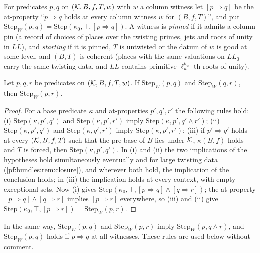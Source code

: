 For predicates $p,q$ on $(\mathcal K,B,f,T,w)$ with $w$ a column witness let $[p\Rightarrow q]$ be the at-property ``$p\Rightarrow q$
holds at every column witness $w$ for $(B,f,T)$'', and put $\mathrm{Step}_W(p,q)=\mathrm{Step}(\kappa_0,\top,[p\Rightarrow q])$. A
witness is \emph{pinned} if it admits a column pin (a record of
choices of places over the twisting primes, jets and roots of unity in $\mathit{LL}$), and \emph{starting} if it is pinned,
$T$ is untwisted or the datum of $w$ is good at some level, and $(B,T)$ is coherent (places with the same valuations on
$\mathit{LL}_0$ carry the same twisting data, and $\mathit{LL}$ contains primitive $\ell_w^{k_w}$-th roots of unity).

\begin{lemma}\label{pf:bundles:lem:stepw}
Let $p,q,r$ be predicates on $(\mathcal K,B,f,T,w)$. If $\mathrm{Step}_W(p,q)$ and $\mathrm{Step}_W(q,r)$, then $\mathrm{Step}_W(p,r)$.
\end{lemma}

\begin{proof}
For a base predicate $\kappa$ and at-properties $p',q',r'$ the following rules hold: (i) $\mathrm{Step}(\kappa,p',q')$ and
$\mathrm{Step}(\kappa,p',r')$ imply $\mathrm{Step}(\kappa,p',q'\wedge r')$; (ii) $\mathrm{Step}(\kappa,p',q')$ and
$\mathrm{Step}(\kappa,q',r')$ imply $\mathrm{Step}(\kappa,p',r')$; (iii) if $p'\Rightarrow q'$ holds at every $(\mathcal K,B,f,T)$ such that the
pre-base of $B$ lies under $\mathcal K$, $\kappa(B,f)$ holds and $T$ is forced, then $\mathrm{Step}(\kappa,p',q')$. In (i) and (ii) the two
implications of the hypotheses hold simultaneously eventually and for large twisting data (\cref{pf:bundles:rem:closure}), and wherever
both hold, the implication of the conclusion holds; in (iii) the implication holds at every context, with empty exceptional sets. Now (i)
gives $\mathrm{Step}(\kappa_0,\top,[p\Rightarrow q]\wedge[q\Rightarrow r])$; the at-property $[p\Rightarrow q]\wedge[q\Rightarrow r]$
implies $[p\Rightarrow r]$ everywhere, so (iii) and (ii) give $\mathrm{Step}(\kappa_0,\top,[p\Rightarrow r])=\mathrm{Step}_W(p,r)$.
\end{proof}

In the same way, $\mathrm{Step}_W(p,q)$ and $\mathrm{Step}_W(p,r)$ imply $\mathrm{Step}_W(p,q\wedge r)$, and $\mathrm{Step}_W(p,q)$ holds
if $p\Rightarrow q$ at all witnesses. These rules are used below without comment.

